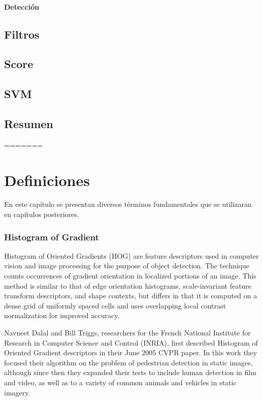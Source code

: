 \subsubsection{Detección}

\section{Filtros}
\label{subsec:fl}

\section{Score}
\label{subsec:score}

\section{SVM}
\section{Resumen}
=======
\chapter[Definiciones ]{Definiciones }\label{ch:capitulo3}
En este capítulo se presentan diversos términos fundamentales que se utilizaran en capítulos posteriores.

\subsection{Histogram of Gradient}
\label{subsec:hog}
Histogram of Oriented Gradients (HOG) are feature descriptors used in computer vision and image processing for the purpose of object detection. The technique counts occurrences of gradient orientation in localized portions of an image. This method is similar to that of edge orientation histograms, scale-invariant feature transform descriptors, and shape contexts, but differs in that it is computed on a dense grid of uniformly spaced cells and uses overlapping local contrast normalization for improved accuracy.

Navneet Dalal and Bill Triggs, researchers for the French National Institute for Research in Computer Science and Control (INRIA), first described Histogram of Oriented Gradient descriptors in their June 2005 CVPR paper. In this work they focused their algorithm on the problem of pedestrian detection in static images, although since then they expanded their tests to include human detection in film and video, as well as to a variety of common animals and vehicles in static imagery.

